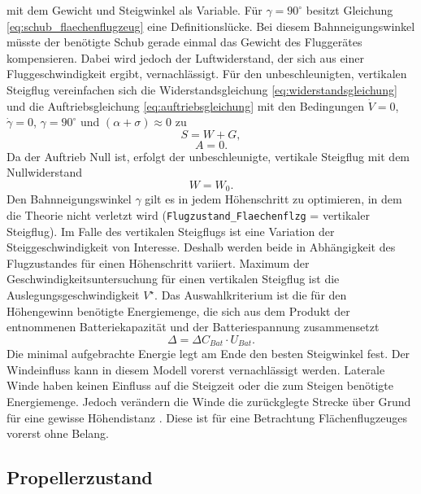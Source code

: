 mit dem Gewicht und Steigwinkel als Variable.
Für \ensuremath{\gamma = 90^\circ} besitzt Gleichung \ref{eq:schub_flaechenflugzeug} eine Definitionslücke. Bei diesem Bahnneigungswinkel müsste der benötigte Schub gerade einmal das Gewicht des Fluggerätes kompensieren. Dabei wird jedoch der Luftwiderstand, der sich aus einer Fluggeschwindigkeit ergibt, vernachlässigt. 
Für den unbeschleunigten, vertikalen Steigflug vereinfachen sich die Widerstandsgleichung \ref{eq:widerstandsgleichung} und die Auftriebsgleichung \ref{eq:auftriebsgleichung} mit den Bedingungen \ensuremath{\dot{V} = 0}, \ensuremath{\dot{\gamma} = 0}, \ensuremath{\gamma = 90^\circ} und \ensuremath{(\alpha + \sigma) \approx 0} zu 
\begin{equation}
	S = W + G , 
\end{equation}
\begin{equation}
	A = 0 .
\end{equation}
Da der Auftrieb Null ist, erfolgt der unbeschleunigte, vertikale Steigflug mit dem Nullwiderstand
\begin{equation}
	W = W_0 .
\end{equation}
Den Bahnneigungswinkel \ensuremath{\gamma} gilt es in jedem Höhenschritt zu optimieren, in dem die Theorie nicht verletzt wird (\texttt{Flugzustand\_Flaechenflzg} = vertikaler Steigflug). Im Falle des vertikalen Steigflugs ist eine Variation der Steiggeschwindigkeit von Interesse. Deshalb werden beide in Abhängigkeit des Flugzustandes für einen Höhenschritt variiert. Maximum der Geschwindigkeitsuntersuchung für einen vertikalen Steigflug ist die Auslegungsgeschwindigkeit \ensuremath{V^\star}. Das Auswahlkriterium ist die für den Höhengewinn benötigte Energiemenge, die sich aus dem Produkt der entnommenen Batteriekapazität und der Batteriespannung zusammensetzt
\begin{equation}
	\Delta = \Delta C_{Bat}\cdot U_{Bat}.
\end{equation}
Die minimal aufgebrachte Energie legt am Ende den besten Steigwinkel fest.
Der Windeinfluss kann in diesem Modell vorerst vernachlässigt werden. Laterale Winde haben keinen Einfluss auf die Steigzeit oder die zum Steigen benötigte Energiemenge. Jedoch verändern die Winde die zurückglegte Strecke über Grund für eine gewisse Höhendistanz \cite[S.241-242]{Scheiderer.2008}. Diese ist für eine Betrachtung Flächenflugzeuges vorerst ohne Belang. 


\subsection{Propellerzustand}
\label{subsec:propellerzustand}

